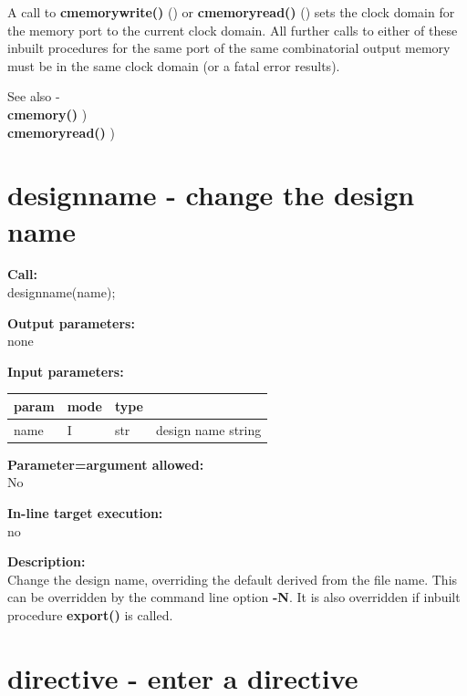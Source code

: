         A call to {\bf cmemorywrite()} () or {\bf
        cmemoryread()} () sets the clock domain for
        the memory port to the current clock domain. All further calls to either of
        these inbuilt procedures for the same port of the same combinatorial output
        memory must be in the same clock domain (or a fatal error results).
        
        See also - \\
        {\bf cmemory()} ) \\
        {\bf cmemoryread()} ) \\


    \section{designname - change the design name}\label{sec:ipdesignname}
        
        {\bf Call:} \\
        designname(name);
        
        {\bf Output parameters:} \\
        none
        
        {\bf Input parameters:} \\
        \begin{tabular}{| l | l | l | l |}
        \hline
        param  & mode & type & \\
        \hline \hline
        name   & I    & str  & design name string   \\ \hline
        \end{tabular}
        
        {\bf Parameter=argument allowed:} \\
        No
        
        {\bf In-line target execution:} \\
        no
        
        {\bf Description:} \\
        Change the design name, overriding the default derived from
        the file name. This can be overridden by the command line option
        {\bf -N}. It is also overridden if inbuilt procedure {\bf export()}
        is called.



    \section{directive - enter a directive}\label{sec:ipdirective}
        
